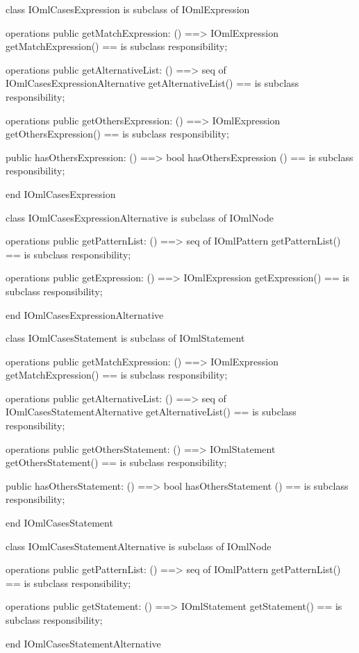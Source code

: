 \begin{vdm_al}
class IOmlCasesExpression
 is subclass of IOmlExpression

operations
  public getMatchExpression: () ==> IOmlExpression
  getMatchExpression() == is subclass responsibility;

operations
  public getAlternativeList: () ==> seq of IOmlCasesExpressionAlternative
  getAlternativeList() == is subclass responsibility;

operations
  public getOthersExpression: () ==> IOmlExpression
  getOthersExpression() == is subclass responsibility;

  public hasOthersExpression: () ==> bool
  hasOthersExpression () == is subclass responsibility;

end IOmlCasesExpression
\end{vdm_al}

\begin{vdm_al}
class IOmlCasesExpressionAlternative
 is subclass of IOmlNode

operations
  public getPatternList: () ==> seq of IOmlPattern
  getPatternList() == is subclass responsibility;

operations
  public getExpression: () ==> IOmlExpression
  getExpression() == is subclass responsibility;

end IOmlCasesExpressionAlternative
\end{vdm_al}

\begin{vdm_al}
class IOmlCasesStatement
 is subclass of IOmlStatement

operations
  public getMatchExpression: () ==> IOmlExpression
  getMatchExpression() == is subclass responsibility;

operations
  public getAlternativeList: () ==> seq of IOmlCasesStatementAlternative
  getAlternativeList() == is subclass responsibility;

operations
  public getOthersStatement: () ==> IOmlStatement
  getOthersStatement() == is subclass responsibility;

  public hasOthersStatement: () ==> bool
  hasOthersStatement () == is subclass responsibility;

end IOmlCasesStatement
\end{vdm_al}

\begin{vdm_al}
class IOmlCasesStatementAlternative
 is subclass of IOmlNode

operations
  public getPatternList: () ==> seq of IOmlPattern
  getPatternList() == is subclass responsibility;

operations
  public getStatement: () ==> IOmlStatement
  getStatement() == is subclass responsibility;

end IOmlCasesStatementAlternative
\end{vdm_al}


